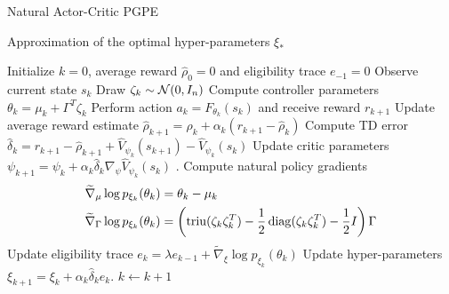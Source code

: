 \begin{algorithm}[t!]
	\caption{Natural Actor-Critic PGPE}
	\label{algo:NACPGPE}
	\begin{algorithmic}[0]
		\Ensure Approximation of the optimal hyper-parameters $\xi_*$
		\begin{algorithmic}[1]
		\State Initialize $k = 0$, average reward $\widehat{\rho}_0 = 0$ and eligibility trace $e_{-1} = 0$
		\Repeat
			\State Observe current state $s_k$
			\State Draw $\zeta_k \sim \mathcal{N}(0, I_n)$
			\State Compute controller parameters $\theta_k = \mu_k + \Gamma^T \zeta_k$
			\State Perform action $a_k = F_{\theta_k}(s_k)$ and receive reward $r_{k+1}$
			\State Update average reward estimate $\widehat{\rho}_{k+1} = \widehat{\rho}_{k} + \alpha_k (r_{k+1} - \widehat{\rho}_{k})$
			\State Compute TD error $\widehat{\delta}_k = r_{k+1} - \widehat{\rho}_{k+1} + \widehat{V}_{\psi_k}(s_{k+1}) - \widehat{V}_{\psi_k}(s_k)$
			\State Update critic parameters $	\psi_{k+1} = \psi_k + \alpha_k \widehat{\delta}_k \nabla_\psi \widehat{V}_{\psi_k}(s_k)$ . 
			\State Compute natural policy gradients
				\begin{equation*}
					\begin{split}
						\widetilde{\nabla}_\mu \log p_{\xi_k}(\theta_k) &= \theta_k - \mu_k\\
						\widetilde{\nabla}_\Gamma \log p_{\xi_k}(\theta_k) &= \left(\operatorname{triu}(\zeta_k \zeta_k^T) - \frac{1}{2} \operatorname{diag}(\zeta_k \zeta_k^T) - \frac{1}{2} I \right) \Gamma
					\end{split}
				\end{equation*}
			\State Update eligibility trace $e_{k} = \lambda e_{k-1} + \widetilde{\nabla}_\xi \log p_{\xi_k}(\theta_k)$
			\State Update hyper-parameters $\xi_{k+1} = \xi_k + \alpha_k \widehat{\delta}_k e_k$. 
			\State $k \leftarrow k + 1$
		\end{algorithmic}
	\end{algorithmic}
\end{algorithm}  
\clearpage

